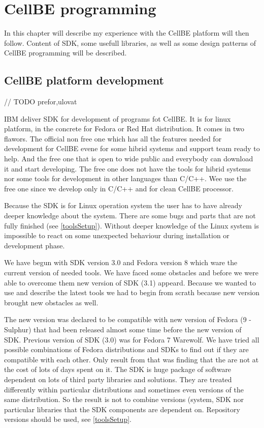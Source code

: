 \chapter {CellBE programming} 
\par
In this chapter will describe my experience with the CellBE platform will then follow.
Content of SDK, some usefull libraries, as well as some design patterns of CellBE programming will be described.

\section{CellBE platform development}	// TODO prefor,ulovat
\par
IBM deliver SDK for development of programs fot CellBE. It is for linux platform, in the concrete for Fedora or Red Hat distribution.
It comes in two flawors.
The official non free one which has all the features needed for development for CellBE evene for some hibrid systems and support team ready to help.
And the free one that is open to wide public and everybody can download it and start developing.
The free one does not have the tools for hibrid systems nor some tools for development in other languages than C/C++.
Wee use the free one since we develop only in C/C++ and for clean CellBE processor.

\par
Because the SDK is for Linux operation system the user has to have already deeper knowledge about the system.
There are some bugs and parts that are not fully finished (see \ref{toolsSetup}).
Without deeper knowledge of the Linux system is impossible to react on some unexpected behaviour during installation or development phase.

\par
We have begun with SDK version 3.0 and Fedora version 8 which ware the current version of needed tools.
We have faced some obstacles and before we were able to overcome them new version of SDK (3.1) appeard.
Because we wanted to use and describe the latest tools we had to begin from scrath because new version brought new obstacles as well.

\par
The new version was declared to be compatible with new version of Fedora (9 - Sulphur) that had been released almost some time before the new version of SDK.
Previous version of SDK (3.0) was for Fedora 7 Warewolf.
We have tried all possible combinations of Fedora distributions and SDKs to find out if they are compatible with each other.
Only result from that was finding that the are not at the cost of lots of days spent on it.
The SDK is huge package of software dependent on lots of third party libraries and solutions.
They are treated differently within particular distributions and sometimes even versions of the same distribution.
So the result is not to combine versions (system, SDK nor particular libraries that the SDK components are dependent on.
Repository versions should be used, see \ref{toolsSetup}.

